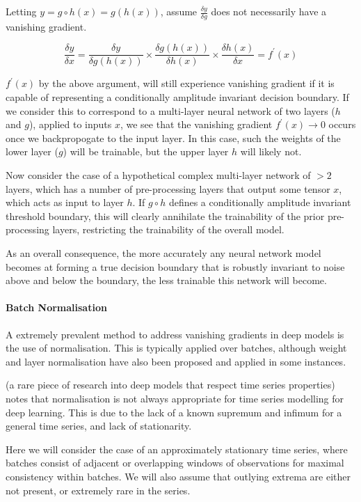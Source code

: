 \documentclass[9pt,conference]{IEEEtran}
\begin{document}
Letting $y = g\circ h(x) = g(h(x))$, assume $\displaystyle \frac{\delta y}{\delta g}$ does not necessarily have a vanishing gradient. 

\begin{equation*}
\displaystyle \frac{\delta y}{\delta x} =  \frac{\delta y}{\delta g(h(x))} \times \frac{\delta g(h(x))}{\delta h(x)} \times  \frac{\delta h(x)}{\delta x} = f^\prime(x)
\end{equation*}

$f^\prime(x)$ by the above argument, will still experience vanishing gradient if it is capable of representing a conditionally amplitude invariant decision boundary. If we consider this to correspond to a multi-layer neural network of two layers ($h$ and $g$), applied to inputs $x$, we see that the vanishing gradient $f^\prime(x)\to 0$ occurs once we backpropogate to the input layer. In this case, such the weights of the lower layer ($g$) will be trainable, but the upper layer $h$ will likely not. 

Now consider the case of a hypothetical complex multi-layer network of $>2$ layers, which has a number of pre-processing layers that output some tensor $x$, which acts as input to layer $h$. If $g\circ h$ defines a conditionally amplitude invariant threshold boundary, this will clearly annihilate the trainability of the prior pre-processing layers, restricting the trainability of the overall model.

As an overall consequence, the more accurately any neural network model becomes at forming a true decision boundary that is robustly invariant to noise above and below the boundary, the less trainable this network will become.

\paragraph{Batch Normalisation}
A extremely prevalent method to address vanishing gradients in deep models is the use of normalisation. This is typically applied over batches, although weight and layer normalisation have also been proposed and applied in some instances.

\cite{invariantsWithDNN} (a rare piece of research into deep models that respect time series properties) notes that normalisation is not always appropriate for time series modelling for deep learning. This is due to the lack of a known supremum and infimum for a general time series, and lack of stationarity. 

Here we will consider the case of an approximately stationary time series, where batches consist of adjacent or overlapping windows of observations for maximal consistency within batches. We will also assume that outlying extrema are either not present, or extremely rare in the series.
\end{document}
